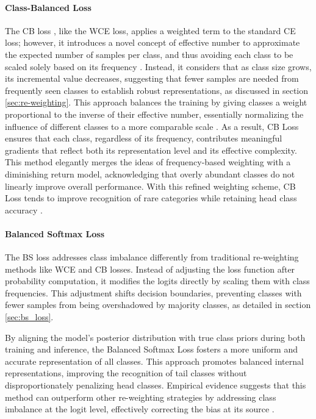 \paragraph{Class-Balanced Loss}
The CB loss \cite{cui2019classbalancedlossbasedeffective}, like the WCE loss, applies a weighted term to the standard CE loss; however, it introduces a novel concept of effective number to approximate the expected number of samples per class, and thus avoiding each class to be scaled solely based on its frequency \cite{zhang2023deep,cui2019classbalancedlossbasedeffective}. Instead, it considers that as class size grows, its incremental value decreases, suggesting that fewer samples are needed from frequently seen classes to establish robust representations, as discussed in section \ref{sec:re-weighting}. This approach balances the training by giving classes a weight proportional to the inverse of their effective number, essentially normalizing the influence of different classes to a more comparable scale \cite{zhang2023deep}. As a result, CB Loss ensures that each class, regardless of its frequency, contributes meaningful gradients that reflect both its representation level and its effective complexity. This method elegantly merges the ideas of frequency-based weighting with a diminishing return model, acknowledging that overly abundant classes do not linearly improve overall performance. With this refined weighting scheme, CB Loss tends to improve recognition of rare categories while retaining head class accuracy \cite{cui2019classbalancedlossbasedeffective}. 

\paragraph{Balanced Softmax Loss}
The BS loss \cite{ren2020balancedmetasoftmaxlongtailedvisual} addresses class imbalance differently from traditional re-weighting methods like WCE and CB losses. Instead of adjusting the loss function after probability computation, it modifies the logits directly by scaling them with class frequencies. This adjustment shifts decision boundaries, preventing classes with fewer samples from being overshadowed by majority classes, as detailed in section \ref{sec:bs_loss}.

By aligning the model's posterior distribution with true class priors during both training and inference, the Balanced Softmax Loss fosters a more uniform and accurate representation of all classes. This approach promotes balanced internal representations, improving the recognition of tail classes without disproportionately penalizing head classes. Empirical evidence suggests that this method can outperform other re-weighting strategies by addressing class imbalance at the logit level, effectively correcting the bias at its source \cite{ren2020balancedmetasoftmaxlongtailedvisual}.

